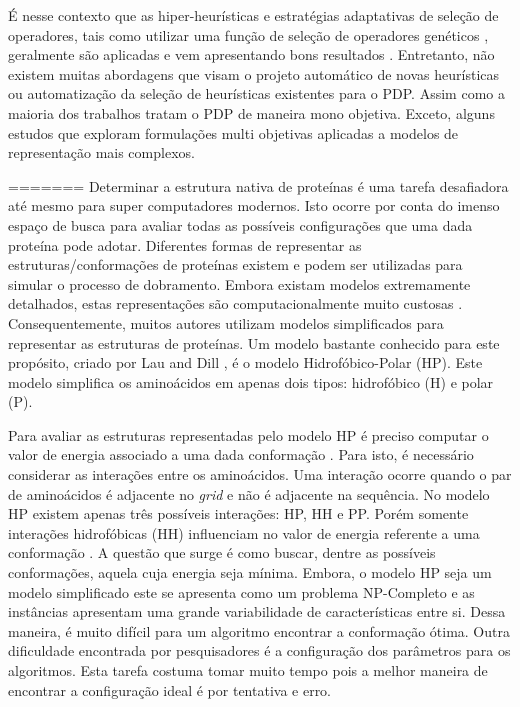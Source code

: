 É nesse contexto que as hiper-heurísticas e estratégias adaptativas de seleção de operadores, tais como utilizar uma função de seleção de operadores genéticos \cite{misir2012intelligent}, geralmente são aplicadas e vem apresentando bons resultados \cite{burke2013hyper}. Entretanto, não existem muitas abordagens que visam o projeto automático de novas heurísticas ou automatização da seleção de heurísticas existentes para o PDP. Assim como a maioria dos trabalhos tratam o PDP de maneira mono objetiva. Exceto, alguns estudos que exploram formulações multi objetivas aplicadas a modelos de representação mais complexos.
 
=======
Determinar a estrutura nativa de proteínas é uma tarefa desafiadora até mesmo para super computadores modernos. Isto ocorre por conta do imenso espaço de busca para avaliar todas as possíveis configurações que uma dada proteína pode adotar. Diferentes formas de representar as estruturas/conformações de proteínas existem e podem ser utilizadas para simular o processo de dobramento. Embora existam modelos extremamente detalhados, estas representações são computacionalmente muito custosas \cite{benitez2015algoritmo, santana2008protein}. Consequentemente, muitos autores \cite{custodio2004investigation,hsu2003growth,lin2011protein,unger1993genetic,santana2008protein,custodio2014multiple, garza2012locality} utilizam modelos simplificados para representar as estruturas de proteínas. Um modelo bastante conhecido para este propósito, criado por Lau and Dill \cite{lau1989lattice}, é o modelo Hidrofóbico-Polar (HP). Este modelo simplifica os aminoácidos em apenas dois tipos: hidrofóbico (H) e polar (P). 

Para avaliar as estruturas representadas pelo modelo HP é preciso computar o valor de energia associado a uma dada conformação \cite{unger1993genetic}. Para isto, é necessário considerar as interações entre os aminoácidos. Uma interação ocorre quando o par de aminoácidos é adjacente no \textit{grid} e não é adjacente na sequência. No modelo HP existem apenas três possíveis interações: HP, HH e PP. Porém somente interações hidrofóbicas (HH) influenciam no valor de energia referente a uma conformação \cite{unger1993genetic}. A questão que surge é como buscar, dentre as possíveis conformações, aquela cuja energia seja mínima. Embora, o modelo HP seja um modelo simplificado este se apresenta como um problema NP-Completo e as instâncias apresentam uma grande variabilidade de características entre si. Dessa maneira, é muito difícil para um algoritmo encontrar a conformação ótima. Outra dificuldade encontrada por pesquisadores é a configuração dos parâmetros para os algoritmos. Esta tarefa costuma tomar muito tempo pois a melhor maneira de encontrar a configuração ideal é por tentativa e erro.

